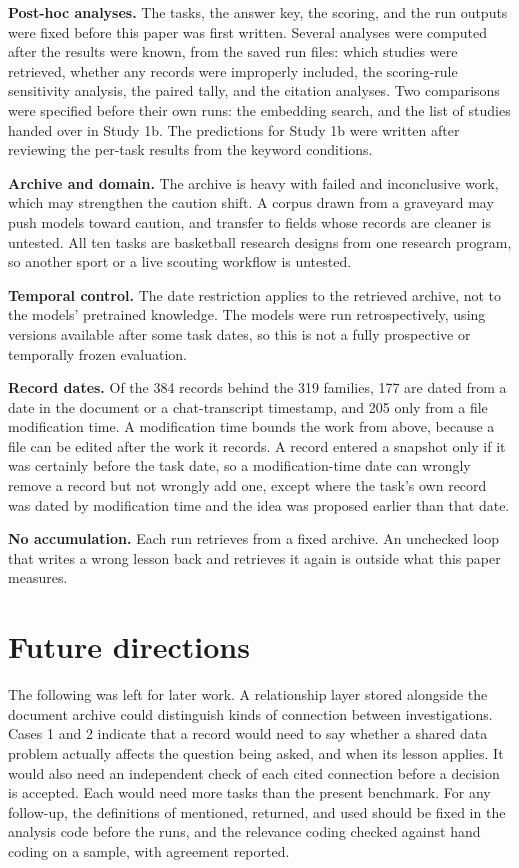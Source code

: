 \documentclass[11pt]{article}
\begin{document}
\textbf{Post-hoc analyses.} The tasks, the answer key, the scoring, and the run outputs were fixed before this paper was first written. Several analyses were computed after the results were known, from the saved run files: which studies were retrieved, whether any records were improperly included, the scoring-rule sensitivity analysis, the paired tally, and the citation analyses. Two comparisons were specified before their own runs: the embedding search, and the list of studies handed over in Study 1b. The predictions for Study 1b were written after reviewing the per-task results from the keyword conditions.

\textbf{Archive and domain.} The archive is heavy with failed and inconclusive work, which may strengthen the caution shift. A corpus drawn from a graveyard may push models toward caution, and transfer to fields whose records are cleaner is untested. All ten tasks are basketball research designs from one research program, so another sport or a live scouting workflow is untested.

\textbf{Temporal control.} The date restriction applies to the retrieved archive, not to the models' pretrained knowledge. The models were run retrospectively, using versions available after some task dates, so this is not a fully prospective or temporally frozen evaluation.

\textbf{Record dates.} Of the 384 records behind the 319 families, 177 are dated from a date in the document or a chat-transcript timestamp, and 205 only from a file modification time. A modification time bounds the work from above, because a file can be edited after the work it records. A record entered a snapshot only if it was certainly before the task date, so a modification-time date can wrongly remove a record but not wrongly add one, except where the task's own record was dated by modification time and the idea was proposed earlier than that date.

\textbf{No accumulation.} Each run retrieves from a fixed archive. An unchecked loop that writes a wrong lesson back and retrieves it again is outside what this paper measures.

\section{Future directions}
\label{sec:future}

The following was left for later work. A relationship layer stored alongside the document archive could distinguish kinds of connection between investigations. Cases 1 and 2 indicate that a record would need to say whether a shared data problem actually affects the question being asked, and when its lesson applies. It would also need an independent check of each cited connection before a decision is accepted. Each would need more tasks than the present benchmark. For any follow-up, the definitions of mentioned, returned, and used should be fixed in the analysis code before the runs, and the relevance coding checked against hand coding on a sample, with agreement reported.
\end{document}
